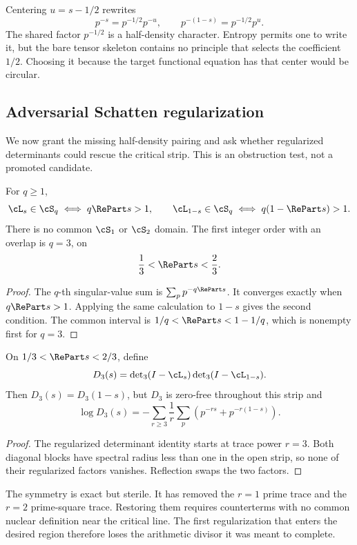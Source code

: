 Centering $u=s-1/2$ rewrites
\[
 p^{-s}=p^{-1/2}p^{-u},
 \qquad
 p^{-(1-s)}=p^{-1/2}p^u.
\]
The shared factor $p^{-1/2}$ is a half-density character. Entropy permits
one to write it, but the bare tensor skeleton contains no principle that
selects the coefficient $1/2$. Choosing it because the target functional
equation has that center would be circular.

\subsection{Adversarial Schatten regularization}

We now grant the missing half-density pairing and ask whether regularized
determinants could rescue the critical strip. This is an obstruction test,
not a promoted candidate.

\begin{theorem}
\label{thm:schatten}
For $q\ge1$,
\[
 \cL_s\in\cS_q\iff q\RePart s>1,
 \qquad
 \cL_{1-s}\in\cS_q\iff q(1-\RePart s)>1.
\]
There is no common $\cS_1$ or $\cS_2$ domain. The first integer order with
an overlap is $q=3$, on
\[
 \frac13<\RePart s<\frac23.
\]
\end{theorem}

\begin{proof}
The $q$-th singular-value sum is $\sum_p p^{-q\RePart s}$. It converges
exactly when $q\RePart s>1$. Applying the same calculation to $1-s$ gives
the second condition. The common interval is
$1/q<\RePart s<1-1/q$, which is nonempty first for $q=3$.
\end{proof}

\begin{theorem}
\label{thm:det3}
On $1/3<\RePart s<2/3$, define
\[
 D_3(s)
 =\det\nolimits_3(I-\cL_s)
  \det\nolimits_3(I-\cL_{1-s}).
\]
Then $D_3(s)=D_3(1-s)$, but $D_3$ is zero-free throughout this strip and
\[
 \log D_3(s)
 =-\sum_{r\ge3}\frac1r
  \sum_p\left(p^{-rs}+p^{-r(1-s)}\right).
\]
\end{theorem}

\begin{proof}
The regularized determinant identity starts at trace power $r=3$.
Both diagonal blocks have spectral radius less than one in the open strip,
so none of their regularized factors vanishes. Reflection swaps the two
factors.
\end{proof}

The symmetry is exact but sterile. It has removed the $r=1$ prime trace and
the $r=2$ prime-square trace. Restoring them requires counterterms with no
common nuclear definition near the critical line. The first regularization
that enters the desired region therefore loses the arithmetic divisor it was
meant to complete.

